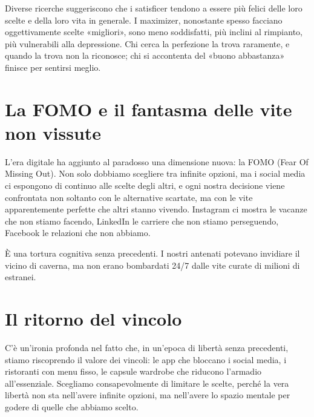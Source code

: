 \begin{figure}[htbp]
	\centering
	\label{fig:maximizer_satisficer}
\end{figure}

Diverse ricerche suggeriscono che i satisficer tendono a essere più felici delle loro scelte e della loro vita in generale. I maximizer, nonostante spesso facciano oggettivamente scelte «migliori», sono meno soddisfatti, più inclini al rimpianto, più vulnerabili alla depressione. Chi cerca la perfezione la trova raramente, e quando la trova non la riconosce; chi si accontenta del «buono abbastanza» finisce per sentirsi meglio.

\section{La FOMO e il fantasma delle vite non vissute}
\label{sec:p2c21-fomo}

L'era digitale ha aggiunto al paradosso una dimensione nuova: la FOMO (Fear Of Missing Out). Non solo dobbiamo scegliere tra infinite opzioni, ma i social media ci espongono di continuo alle scelte degli altri, e ogni nostra decisione viene confrontata non soltanto con le alternative scartate, ma con le vite apparentemente perfette che altri stanno vivendo. Instagram ci mostra le vacanze che non stiamo facendo, LinkedIn le carriere che non stiamo perseguendo, Facebook le relazioni che non abbiamo.

È una tortura cognitiva senza precedenti. I nostri antenati potevano invidiare il vicino di caverna, ma non erano bombardati 24/7 dalle vite curate di milioni di estranei.

\section{Il ritorno del vincolo}

C'è un'ironia profonda nel fatto che, in un'epoca di libertà senza precedenti, stiamo riscoprendo il valore dei vincoli: le app che bloccano i social media, i ristoranti con menu fisso, le capsule wardrobe che riducono l'armadio all'essenziale. Scegliamo consapevolmente di limitare le scelte, perché la vera libertà non sta nell'avere infinite opzioni, ma nell'avere lo spazio mentale per godere di quelle che abbiamo scelto.

